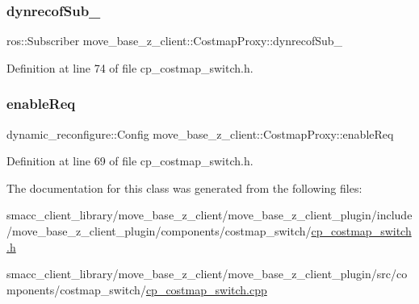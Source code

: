 \subsubsection{\texorpdfstring{dynrecof\+Sub\+\_\+}{dynrecofSub\_}}
{\footnotesize\ttfamily ros\+::\+Subscriber move\+\_\+base\+\_\+z\+\_\+client\+::\+Costmap\+Proxy\+::dynrecof\+Sub\+\_\+\hspace{0.3cm}{\ttfamily [private]}}



Definition at line 74 of file cp\+\_\+costmap\+\_\+switch.\+h.

\mbox{\label{classmove__base__z__client_1_1CostmapProxy_a8839c249af6a53a7dc8f2672966cbbae}} 
\subsubsection{\texorpdfstring{enable\+Req}{enableReq}}
{\footnotesize\ttfamily dynamic\+\_\+reconfigure\+::\+Config move\+\_\+base\+\_\+z\+\_\+client\+::\+Costmap\+Proxy\+::enable\+Req\hspace{0.3cm}{\ttfamily [private]}}



Definition at line 69 of file cp\+\_\+costmap\+\_\+switch.\+h.



The documentation for this class was generated from the following files\+:\begin{DoxyCompactItemize}
\item 
smacc\+\_\+client\+\_\+library/move\+\_\+base\+\_\+z\+\_\+client/move\+\_\+base\+\_\+z\+\_\+client\+\_\+plugin/include/move\+\_\+base\+\_\+z\+\_\+client\+\_\+plugin/components/costmap\+\_\+switch/\hyperlink{cp__costmap__switch_8h}{cp\+\_\+costmap\+\_\+switch.\+h}\item 
smacc\+\_\+client\+\_\+library/move\+\_\+base\+\_\+z\+\_\+client/move\+\_\+base\+\_\+z\+\_\+client\+\_\+plugin/src/components/costmap\+\_\+switch/\hyperlink{cp__costmap__switch_8cpp}{cp\+\_\+costmap\+\_\+switch.\+cpp}\end{DoxyCompactItemize}
